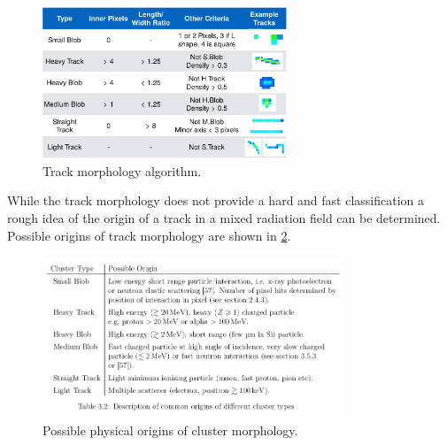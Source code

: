 \begin{figure}[H]
	\begin{center}
	\includegraphics[width=0.65\textwidth]{figures/stuartgraphic.pdf}
	\caption{Track morphology algorithm.\cite{stuartalgo}}
	\label{stuart_algo}
	\end{center}
\end{figure}

While the track morphology does not provide a hard and fast classification a rough idea of the origin of a track in a mixed radiation field can be determined. Possible origins of track morphology are shown in \ref{track_morphology}.

\begin{figure}[H]
	\begin{center}
	\includegraphics[width=0.8\textwidth]{figures/cluster_types.png}
	\caption{Possible physical origins of cluster morphology.\cite{stuartthesis}}
	\label{track_morphology}
	\end{center}
\end{figure}
